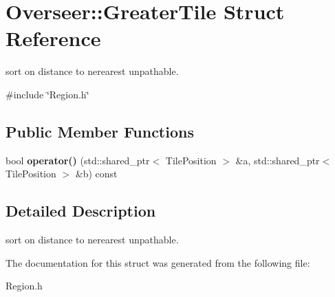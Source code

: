 \hypertarget{structOverseer_1_1GreaterTile}{}\section{Overseer\+:\+:Greater\+Tile Struct Reference}
\label{structOverseer_1_1GreaterTile}


sort on distance to nerearest unpathable.  




{\ttfamily \#include \char`\"{}Region.\+h\char`\"{}}

\subsection*{Public Member Functions}
\begin{DoxyCompactItemize}
\item 
bool {\bfseries operator()} (std\+::shared\+\_\+ptr$<$ Tile\+Position $>$ \&a, std\+::shared\+\_\+ptr$<$ Tile\+Position $>$ \&b) const \hypertarget{structOverseer_1_1GreaterTile_a7df65c34af87144d96c17ffbedc5510d}{}\label{structOverseer_1_1GreaterTile_a7df65c34af87144d96c17ffbedc5510d}

\end{DoxyCompactItemize}


\subsection{Detailed Description}
sort on distance to nerearest unpathable. 

The documentation for this struct was generated from the following file\+:\begin{DoxyCompactItemize}
\item 
Region.\+h\end{DoxyCompactItemize}

